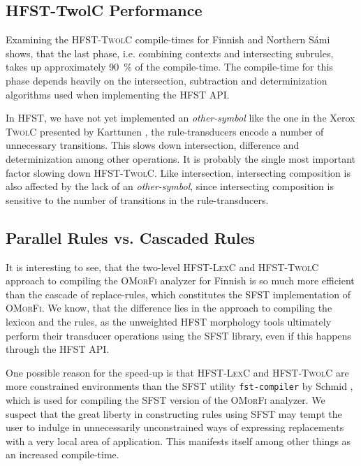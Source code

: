\documentclass[postprint]{flammie}
\begin{document}
\subsection{HFST-TwolC Performance} 

Examining the \textsc{HFST-TwolC} compile-times for Finnish and
Northern S\'ami shows, that the last phase, i.e. combining contexts
and intersecting subrules, takes up approximately 90~\% of the
compile-time. The compile-time for this phase depends heavily on the
intersection, subtraction and determinization algorithms used when
implementing the \textsc{HFST} API.

In \textsc{HFST}, we have not yet implemented an \textit{other-symbol}
like the one in the Xerox \textsc{TwolC} presented by Karttunen
\cite{Karttunen92}, the rule-transducers encode a number of
unnecessary transitions.  This slows down intersection, difference and
determinization among other operations. It is probably the single most
important factor slowing down \textsc{HFST-TwolC}. Like intersection,
intersecting composition is also affected by the lack of an
\textit{other-symbol}, since intersecting composition is sensitive to
the number of transitions in the rule-transducers.

\subsection{Parallel Rules vs. Cascaded Rules} 

It is interesting to see, that the two-level \textsc{HFST-LexC} and
\textsc{HFST-TwolC} approach to compiling the \textsc{OMorFi} analyzer
for Finnish is so much more efficient than the cascade of
replace-rules, which constitutes the \textsc{SFST} implementation of
\textsc{OMorFi}. We know, that the difference lies in the approach to
compiling the lexicon and the rules, as the unweighted \textsc{HFST}
morphology tools ultimately perform their transducer operations using
the \textsc{SFST} library, even if this happens through the
\textsc{HFST} API.

One possible reason for the speed-up is that \textsc{HFST-LexC} and
\textsc{HFST-TwolC} are more constrained environments than the
\textsc{SFST} utility \texttt{fst-compiler} by Schmid \cite{sfst},
which is used for compiling the \textsc{SFST} version of the
\textsc{OMorFi} analyzer. We suspect that the great liberty in
constructing rules using \textsc{SFST} may tempt the user to indulge
in unnecessarily unconstrained ways of expressing replacements with a
very local area of application. This manifests itself among other
things as an increased compile-time.
\end{document}
